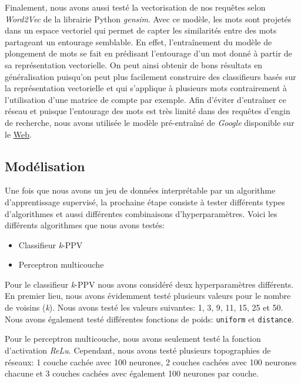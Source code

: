 Finalement, nous avons aussi testé la vectorisation de nos requêtes selon \textit{Word2Vec} de la librairie Python \textit{gensim}.
Avec ce modèle, les mots sont projetés dans un espace vectoriel qui permet de capter les similarités entre des mots partageant un entourage semblable. En effet, l'entraînement du modèle de plongement de mots se fait en prédisant l'entourage d'un mot donné à partir de sa représentation vectorielle. On peut ainsi obtenir de bons résultats en généralisation puisqu'on peut plus facilement construire des classifieurs basés sur la représentation vectorielle et qui s'applique à plusieurs mots contrairement à l'utilisation d'une matrice de compte par exemple. Afin d'éviter d'entraîner ce réseau et puisque l'entourage des mots est très limité dans des requêtes d'engin de recherche, nous avons utilisée le modèle pré-entraîné de \emph{Google} disponible sur le \href{https://code.google.com/archive/p/word2vec/}{Web}.


\subsection{Modélisation}

Une fois que nous avons un jeu de données interprétable par un algorithme d'apprentissage supervisé, la prochaine étape consiste à tester différents types d'algorithmes et aussi différentes combinaisons d'hyperparamètres. Voici les différents algorithmes que nous avons testés:

\begin{itemize}
  \item Classifieur \textit{k}-PPV
  \item Perceptron multicouche
\end{itemize}

Pour le classifieur \textit{k}-PPV nous avons considéré deux hyperparamètres différents. En premier lieu, nous avons évidemment testé plusieurs valeurs pour le nombre de voisins (\textit{k}). Nous avons testé les valeurs suivantes: 1, 3, 9, 11, 15, 25 et 50. 
Nous avons également testé différentes fonctions de poids: \texttt{uniform} et \texttt{distance}.

Pour le perceptron multicouche, nous avons seulement testé la fonction d'activation \textit{ReLu}. Cependant, nous avons testé plusieurs topographies de réseaux: 1 couche cachée avec 100 neurones, 2 couches cachées avec 100 neurones chacune et 3 couches cachées avec également 100 neurones par couche.
\break

